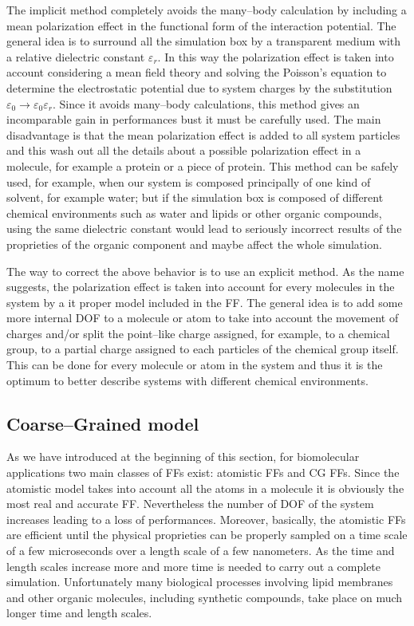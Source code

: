 The implicit method completely avoids the many--body calculation by including a mean polarization effect in the functional form of the interaction potential. The general idea is to surround all the simulation box by a transparent medium with a relative dielectric constant $\varepsilon_r$. In this way the polarization effect is taken into account considering a mean field theory and solving the Poisson's equation to determine the electrostatic potential due to system charges by the substitution $\varepsilon_0\rightarrow\varepsilon_0\varepsilon_r$. Since it avoids many--body calculations, this method gives an incomparable gain in performances bust it must be carefully used. The main disadvantage is that the mean polarization effect is added to all system particles and this wash out all the details about a possible polarization effect in a molecule, for example a protein or a piece of protein. This method can be safely used, for example, when our system is composed principally of one kind of solvent, for example water; but if the simulation box is composed of different chemical environments such as water and lipids or other organic compounds, using the same dielectric constant would lead to seriously incorrect results of the proprieties of the organic component and maybe affect the whole simulation.

The way to correct the above behavior is to use an explicit method. As the name suggests, the polarization effect is taken into account for every molecules in the system by a it proper model included in the \ac{FF}. The general idea is to add some more internal \ac{DOF} to a molecule or atom to take into account the movement of charges and/or split the point--like charge assigned, for example, to a chemical group, to a partial charge assigned to each particles of the chemical group itself. This can be done for every molecule or atom in the system and thus it is the optimum to better describe systems with different chemical environments.

\subsection{Coarse--Grained model}
\label{sec:CGModel}
As we have introduced at the beginning of this section, for biomolecular applications two main classes of \acp{FF} exist: atomistic \acp{FF} and \ac{CG} \acp{FF}. Since the atomistic model takes into account all the atoms in a molecule it is obviously the most real and accurate \ac{FF}. Nevertheless the number of \ac{DOF} of the system increases leading to a loss of performances. Moreover, basically, the atomistic \acp{FF} are efficient until the physical proprieties can be properly sampled on a time scale of a few microseconds over a length scale of a few nanometers. As the time and length scales increase more and more time is needed to carry out a complete simulation. Unfortunately many biological processes involving lipid membranes and other organic molecules, including synthetic compounds, take place on much longer time and length scales.

